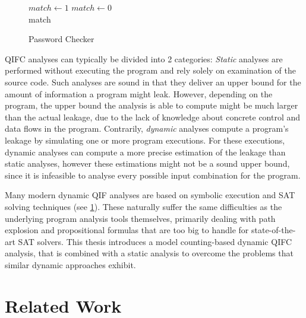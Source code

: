\begin{figure}
\centering
\begin{minipage}{.7\linewidth}
    \begin{algorithm}[H]
        \begin{algorithmic}[1]
                \State $match \leftarrow 1$
            \Else
                \State $match \leftarrow 0$
            \EndIf\\
            \Return match
            \EndProcedure
    \end{algorithmic} 
    \end{algorithm}
    \end{minipage}
    \caption{Password Checker}
    \label{fig:pwChecker}
\end{figure}

QIFC analyses can typically be divided into 2 categories: \emph{Static} analyses are performed without executing the program and rely solely on examination of the source code. Such analyses are sound in that they deliver an upper bound for the amount of information a program might leak. However, depending on the program, the upper bound the analysis is able to compute might be much larger than the actual leakage, due to the lack of knowledge about concrete control and data flows in the program. Contrarily, \emph{dynamic} analyses compute a program's leakage by simulating one or more program executions. For these executions, dynamic analyses can compute a more precise estimation of the leakage than static analyses, however these estimations might not be a sound upper bound, since it is infeasible to analyse every possible input combination for the program.

Many modern dynamic QIF analyses are based on symbolic execution and SAT solving techniques (see \ref{sec:relWork}). These naturally suffer the same difficulties as the underlying program analysis tools themselves, primarily dealing with path explosion and propositional formulas that are too big to handle for state-of-the-art SAT solvers. This thesis introduces a model counting-based dynamic QIFC analysis, that is combined with a static analysis to overcome the problems that similar dynamic approaches exhibit. 

\section{Related Work}\label{sec:relWork}

